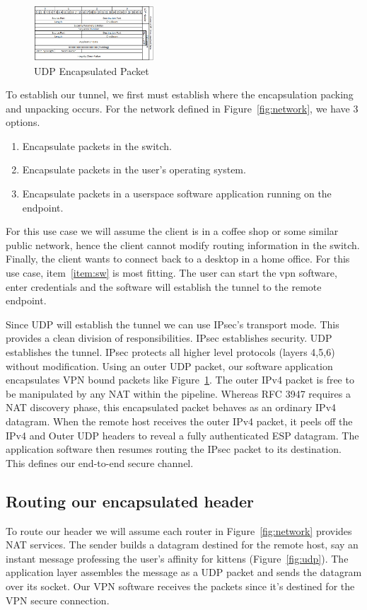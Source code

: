 \documentclass[conference,12pt]{IEEEtran}
\begin{document}
\begin{figure}
\centering
\includegraphics[width=0.4\textwidth]{UDP_encapsualted.PNG}
\caption{UDP Encapsulated Packet}
\label{fig:udp_encap}
\end{figure}

To establish our tunnel, we first must
establish where the encapsulation packing and unpacking occurs. For the
network defined in Figure~\ref{fig:network}, we have 3 options. 
\begin{enumerate}
\item Encapsulate packets in the switch.
\item Encapsulate packets in the user's operating system.
\item \label{item:sw} Encapsulate packets in a userspace software application running on the endpoint.
\end{enumerate}
For this use case we will assume the client is in a coffee shop or some similar
public network, hence the client cannot modify routing information in the switch.
Finally, the client wants to connect back to a desktop in a home office. For
this use case,
item~\ref{item:sw} is most fitting. The user can start the vpn software, enter
credentials and the software will establish the tunnel to the remote endpoint.

Since UDP will establish the tunnel we can use IPsec's transport mode. This
provides a clean division of responsibilities.  IPsec establishes security. UDP
establishes the tunnel.  IPsec protects all higher level protocols
(layers 4,5,6) without modification. Using an outer UDP packet, our software
application encapsulates VPN bound packets like
Figure~\ref{fig:udp_encap}.  The outer IPv4 packet is free to be manipulated
by any NAT within the pipeline. Whereas RFC 3947 requires a NAT discovery phase,
this encapsulated packet behaves as an ordinary IPv4 datagram. When the remote
host receives the outer IPv4 packet, it peels off the IPv4 and Outer UDP headers
to reveal a fully authenticated ESP datagram. The
application software then resumes routing the IPsec packet to its destination.
This defines our end-to-end secure channel.

\subsection{Routing our encapsulated header}
To route our header we will assume each router in Figure~\ref{fig:network}
provides NAT services.  The sender builds a datagram destined for the remote
host, say an
instant message professing the user's affinity for kittens
(Figure~\ref{fig:udp}). The application layer assembles the message as a UDP
packet and sends the datagram over its socket. Our VPN software receives the packets
since it's destined for the VPN secure connection.  
\end{document}
